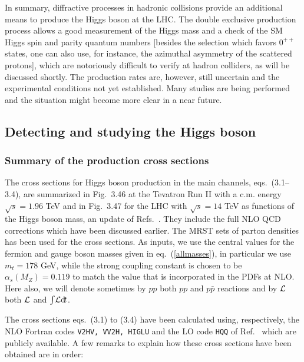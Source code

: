 In summary, diffractive processes in hadronic collisions provide an additional
means to produce the Higgs boson at the LHC. The double exclusive production
process allows a good measurement of the Higgs mass and a check of the SM Higgs
spin and parity quantum numbers [besides the selection which favors $0^{++}$ 
states, one can also use, for instance, the azimuthal asymmetry of the scattered
protons], which are notoriously difficult to verify at hadron colliders, as
will be discussed shortly. The production rates are, however, still uncertain
and the experimental conditions not yet established.  Many studies are being
performed and the situation might become more clear in a near future.  

\subsection{Detecting and studying the Higgs boson} 

\subsubsection{Summary of the production cross sections} 

The cross sections for Higgs boson production in the main channels,
eqs.~(3.1--3.4), are summarized in Fig.~3.46 at the Tevatron Run II with a c.m.
energy $\sqrt{s}=1.96$ TeV and in Fig.~3.47 for the LHC with $\sqrt{s}=14$ TeV
as functions of the Higgs boson mass, an update of
Refs.~\cite{Review-Michael,xs-old-update,xs-talks}.  They include the full NLO
QCD corrections which have been discussed earlier. The MRST sets of parton
densities \cite{MRST2001E} has been used for the cross sections. As inputs, we
use the central values for the fermion and gauge boson masses given in
eq.~(\ref{allmasses}), in particular we use $m_t=178$ GeV, while the strong
coupling constant is chosen to be $\alpha_s (M_Z)=0.119$ to match the value
that is incorporated in the PDFs at NLO. Here also, we will denote sometimes by
$pp$ both $pp$ and $p\bar p$ reactions and by ${\cal L}$ both ${\cal L}$ and
$\int\!{\cal L}{\rm d}\!t$.\s

The cross sections eqs.~(3.1) to (3.4) have been calculated using, respectively,
the NLO {\sc Fortran} codes {\tt V2HV, VV2H, HIGLU} and the LO code {\tt HQQ} 
of Ref.~\cite{Michael-Web} which are publicly available. A few remarks to 
explain how these cross sections have been obtained are in order:\s

